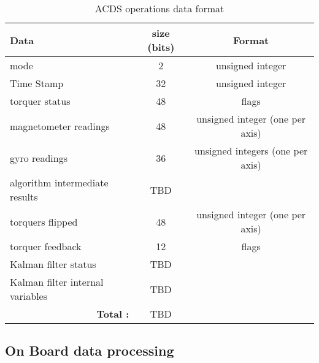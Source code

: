 \begin{comment}
\begin{itemize}
    \item magnetometer and gyro readings
    \item torquer status
    \item mode
    \item algorithm intermediate results
    \item torquers flipped
    \item torquer feedback
    \item Kalman filter status
    \item Kalman filter internal variables
    \item Kalman filter state
    \item \todo[inline]{More?}
\end{itemize}
\end{comment}

\begin{table}[H]
    \centering
    \caption{\ac{ACDS} operations data format}
    \label{tab:logdat}
    \begin{tabular}{|l|c|c|}
        \hline
        Data&size (bits)&Format\\
        \hline
        mode&2&unsigned integer\\
        \hline
        Time Stamp&32&unsigned integer\\
        \hline
        torquer status&48&flags\\
        \hline
        magnetometer readings&48&unsigned integer (one per axis)\\
        \hline
        gyro readings&36&unsigned integers (one per axis)\\
        \hline
        algorithm intermediate results&TBD&\\
        \hline
        torquers flipped&48&unsigned integer (one per axis)\\
        \hline
        torquer feedback&12&flags\\
        \hline
        Kalman filter status&TBD&\\
        \hline
        Kalman filter internal variables&TBD&\\
        \hline
        \multicolumn{1}{|r|}{\bfseries Total :}&TBD&\\
        \hline
    \end{tabular}
\end{table}

\subsection{On Board data processing}

